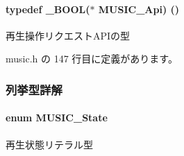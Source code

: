 \paragraph[{M\+U\+S\+I\+C\+\_\+\+Api}]{\setlength{\rightskip}{0pt plus 5cm}typedef {\bf \+\_\+\+B\+O\+O\+L}($\ast$ M\+U\+S\+I\+C\+\_\+\+Api) ()}\label{music_8h_a29e828a1710e2f01e14484306a5a35f6_a29e828a1710e2f01e14484306a5a35f6}


再生操作リクエスト\+A\+P\+Iの型 



 music.\+h の 147 行目に定義があります。



\subsubsection{列挙型詳解}
\paragraph[{M\+U\+S\+I\+C\+\_\+\+State}]{\setlength{\rightskip}{0pt plus 5cm}enum {\bf M\+U\+S\+I\+C\+\_\+\+State}}\label{music_8h_a44fb51174ff72905a037ea2b766dc041_a44fb51174ff72905a037ea2b766dc041}


再生状態リテラル型 


